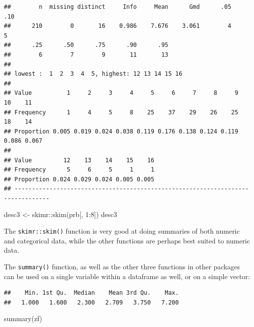 \documentclass[
]{book}
\newenvironment{Shaded}{\begin{snugshade}}{\end{snugshade}}
\newcommand{\DecValTok}[1]{\textcolor[rgb]{0.00,0.00,0.81}{#1}}
\newcommand{\FunctionTok}[1]{\textcolor[rgb]{0.00,0.00,0.00}{#1}}
\newcommand{\NormalTok}[1]{#1}
\newcommand{\OtherTok}[1]{\textcolor[rgb]{0.56,0.35,0.01}{#1}}
\newcommand{\SpecialCharTok}[1]{\textcolor[rgb]{0.00,0.00,0.00}{#1}}
\begin{document}
\begin{verbatim}
##        n  missing distinct     Info     Mean      Gmd      .05      .10 
##      210        0       16    0.986    7.676    3.061        4        5 
##      .25      .50      .75      .90      .95 
##        6        7        9       11       13 
## 
## lowest :  1  2  3  4  5, highest: 12 13 14 15 16
##                                                                             
## Value          1     2     3     4     5     6     7     8     9    10    11
## Frequency      1     4     5     8    25    37    29    26    25    18    14
## Proportion 0.005 0.019 0.024 0.038 0.119 0.176 0.138 0.124 0.119 0.086 0.067
##                                         
## Value         12    13    14    15    16
## Frequency      5     6     5     1     1
## Proportion 0.024 0.029 0.024 0.005 0.005
## --------------------------------------------------------------------------------
\end{verbatim}

\begin{Shaded}
\begin{Highlighting}[]
\NormalTok{desc3 }\OtherTok{\textless{}{-}}\NormalTok{ skimr}\SpecialCharTok{::}\FunctionTok{skim}\NormalTok{(prb[, }\DecValTok{1}\SpecialCharTok{:}\DecValTok{8}\NormalTok{])}
\NormalTok{desc3}
\end{Highlighting}
\end{Shaded}

The \texttt{skimr::skim()} function is very good at doing summaries of both
numeric and categorical data, while the other functions are perhaps best
suited to numeric data.

The \texttt{summary()} function, as well as the other three functions in other
packages can be used on a single variable within a dataframe as well, or
on a simple vector:

\begin{Shaded}
\end{Shaded}

\begin{verbatim}
##    Min. 1st Qu.  Median    Mean 3rd Qu.    Max. 
##   1.000   1.600   2.300   2.709   3.750   7.200
\end{verbatim}

\begin{Shaded}
\begin{Highlighting}[]
\FunctionTok{summary}\NormalTok{(zf)}
\end{Highlighting}
\end{Shaded}
\end{document}
